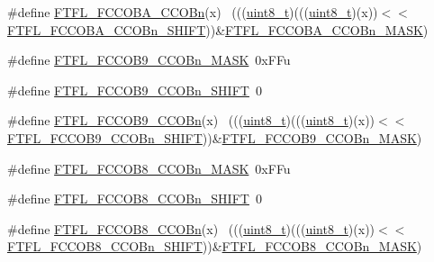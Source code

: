 \begin{DoxyCompactItemize}
\item 
\#define \hyperlink{group___f_t_f_l___register___masks_ga41d45da82803e80c3faaee17a5a120be}{F\+T\+F\+L\+\_\+\+F\+C\+C\+O\+B\+A\+\_\+\+C\+C\+O\+Bn}(x)                                      ~(((\hyperlink{_p_e___types_8h_aba7bc1797add20fe3efdf37ced1182c5}{uint8\+\_\+t})(((\hyperlink{_p_e___types_8h_aba7bc1797add20fe3efdf37ced1182c5}{uint8\+\_\+t})(x))$<$$<$\hyperlink{group___f_t_f_l___register___masks_gaa02cc5a818b780fca7bbfd8755ff6edd}{F\+T\+F\+L\+\_\+\+F\+C\+C\+O\+B\+A\+\_\+\+C\+C\+O\+Bn\+\_\+\+S\+H\+I\+FT}))\&\hyperlink{group___f_t_f_l___register___masks_ga990729a695abb380c9cc804f68ec67b5}{F\+T\+F\+L\+\_\+\+F\+C\+C\+O\+B\+A\+\_\+\+C\+C\+O\+Bn\+\_\+\+M\+A\+SK})
\item 
\#define \hyperlink{group___f_t_f_l___register___masks_ga121ed92b960f5290741c5826b214856c}{F\+T\+F\+L\+\_\+\+F\+C\+C\+O\+B9\+\_\+\+C\+C\+O\+Bn\+\_\+\+M\+A\+SK}~0x\+F\+Fu
\item 
\#define \hyperlink{group___f_t_f_l___register___masks_gafb904bba83e6b2a70c4e119378f2225f}{F\+T\+F\+L\+\_\+\+F\+C\+C\+O\+B9\+\_\+\+C\+C\+O\+Bn\+\_\+\+S\+H\+I\+FT}~0
\item 
\#define \hyperlink{group___f_t_f_l___register___masks_gadc280f275b2251d978f70847f2dde232}{F\+T\+F\+L\+\_\+\+F\+C\+C\+O\+B9\+\_\+\+C\+C\+O\+Bn}(x)                                      ~(((\hyperlink{_p_e___types_8h_aba7bc1797add20fe3efdf37ced1182c5}{uint8\+\_\+t})(((\hyperlink{_p_e___types_8h_aba7bc1797add20fe3efdf37ced1182c5}{uint8\+\_\+t})(x))$<$$<$\hyperlink{group___f_t_f_l___register___masks_gafb904bba83e6b2a70c4e119378f2225f}{F\+T\+F\+L\+\_\+\+F\+C\+C\+O\+B9\+\_\+\+C\+C\+O\+Bn\+\_\+\+S\+H\+I\+FT}))\&\hyperlink{group___f_t_f_l___register___masks_ga121ed92b960f5290741c5826b214856c}{F\+T\+F\+L\+\_\+\+F\+C\+C\+O\+B9\+\_\+\+C\+C\+O\+Bn\+\_\+\+M\+A\+SK})
\item 
\#define \hyperlink{group___f_t_f_l___register___masks_ga8aac72da91fc9360361c969c268bfe05}{F\+T\+F\+L\+\_\+\+F\+C\+C\+O\+B8\+\_\+\+C\+C\+O\+Bn\+\_\+\+M\+A\+SK}~0x\+F\+Fu
\item 
\#define \hyperlink{group___f_t_f_l___register___masks_gaadee561c559788cfc90cac06c3f1dca9}{F\+T\+F\+L\+\_\+\+F\+C\+C\+O\+B8\+\_\+\+C\+C\+O\+Bn\+\_\+\+S\+H\+I\+FT}~0
\item 
\#define \hyperlink{group___f_t_f_l___register___masks_ga7ed57bf3b00f03bddd83944707010678}{F\+T\+F\+L\+\_\+\+F\+C\+C\+O\+B8\+\_\+\+C\+C\+O\+Bn}(x)                                      ~(((\hyperlink{_p_e___types_8h_aba7bc1797add20fe3efdf37ced1182c5}{uint8\+\_\+t})(((\hyperlink{_p_e___types_8h_aba7bc1797add20fe3efdf37ced1182c5}{uint8\+\_\+t})(x))$<$$<$\hyperlink{group___f_t_f_l___register___masks_gaadee561c559788cfc90cac06c3f1dca9}{F\+T\+F\+L\+\_\+\+F\+C\+C\+O\+B8\+\_\+\+C\+C\+O\+Bn\+\_\+\+S\+H\+I\+FT}))\&\hyperlink{group___f_t_f_l___register___masks_ga8aac72da91fc9360361c969c268bfe05}{F\+T\+F\+L\+\_\+\+F\+C\+C\+O\+B8\+\_\+\+C\+C\+O\+Bn\+\_\+\+M\+A\+SK})
$$
\end{DoxyCompactItemize}
